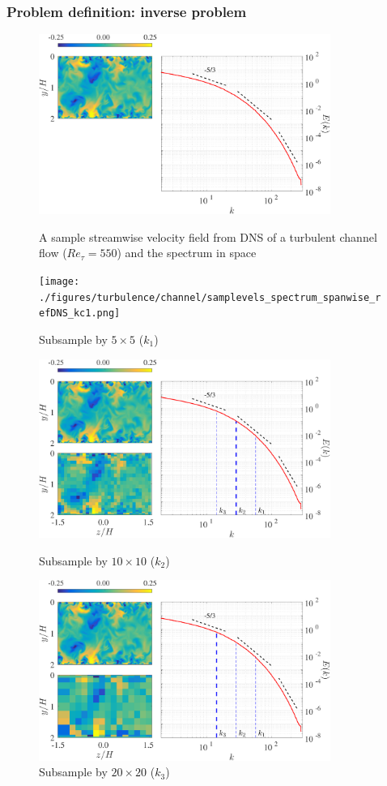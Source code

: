 \documentclass{beamer}
\begin{document}
\begin{frame}
\frametitle{Problem definition: inverse problem}
	\begin{figure}
		\begin{overprint}
			\centerline{\includegraphics[width=0.85\textwidth]{./figures/turbulence/channel/samplevels_spectrum_spanwise_refDNS_ref.png}}
			\caption*{A sample streamwise velocity field from DNS of a turbulent channel flow ($ Re_\tau = 550 $) and the spectrum in space}
			\centerline{\texttt{[image: ./figures/turbulence/channel/samplevels\_spectrum\_spanwise\_refDNS\_kc1.png]}}
			\caption*{Subsample by $ 5 \times 5 $ ($ k_1 $)}
			\centerline{\includegraphics[width=0.85\textwidth]{./figures/turbulence/channel/samplevels_spectrum_spanwise_refDNS_kc2.png}}
			\caption*{Subsample by $ 10 \times 10 $ ($ k_2 $)}
			\centerline{\includegraphics[width=0.85\textwidth]{./figures/turbulence/channel/samplevels_spectrum_spanwise_refDNS_kc3.png}}
			\caption*{Subsample by $ 20 \times 20 $ ($ k_3 $)}
		\end{overprint}				
	\end{figure} 		
\end{frame}
\end{document}
